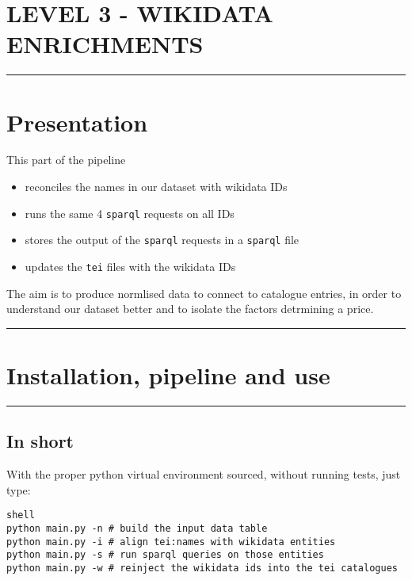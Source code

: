 \section*{LEVEL 3 - WIKIDATA ENRICHMENTS}

\par\noindent\rule{\linewidth}{0.4pt}
\section*{Presentation}

This part of the pipeline

\begin{itemize}
\item reconciles the names in our dataset with wikidata IDs
\item runs the same 4 \texttt{sparql} requests on all IDs
\item stores the output of the \texttt{sparql} requests in a \texttt{sparql} file
\item updates the \texttt{tei} files with the wikidata IDs 
\end{itemize}

The aim is to produce normlised data to connect to catalogue entries, in
order to understand our dataset better and to isolate the factors detrmining
a price.

\par\noindent\rule{\linewidth}{0.4pt}
\section*{Installation, pipeline and use}

\par\noindent\rule{\linewidth}{0.4pt}
\subsection*{In short}

With the proper python virtual environment sourced, without running tests, just type:

\begin{lstlisting}
shell
python main.py -n # build the input data table
python main.py -i # align tei:names with wikidata entities
python main.py -s # run sparql queries on those entities
python main.py -w # reinject the wikidata ids into the tei catalogues
\end{lstlisting}

